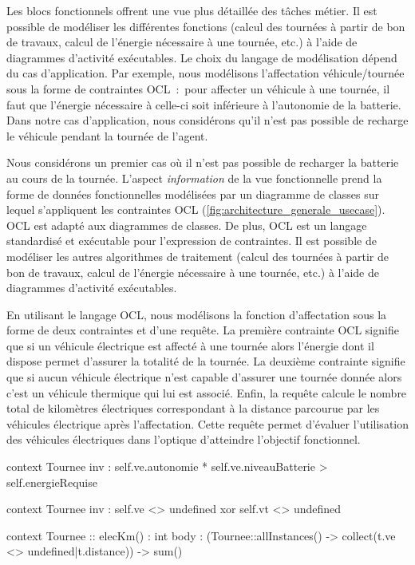 Les blocs fonctionnels offrent une vue plus détaillée des tâches métier. Il est possible de modéliser les différentes fonctions (calcul des tournées à partir de bon de travaux, calcul de l'énergie nécessaire à une tournée, etc.) à l'aide de diagrammes d'activité exécutables. Le choix du langage de modélisation dépend du cas d'application. Par exemple, nous modélisons l'affectation véhicule/tournée sous la forme de contraintes OCL~:~pour affecter un véhicule à une tournée, il faut que l'énergie nécessaire à celle-ci soit inférieure à l'autonomie de la batterie. Dans notre cas d'application, nous considérons qu'il n'est pas possible de recharge le véhicule pendant la tournée de l'agent.

Nous considérons un premier cas où il n'est pas possible de recharger la batterie au cours de la tournée. L'aspect \emph{information} de la vue fonctionnelle prend la forme de données fonctionnelles  modélisées par un diagramme de classes sur lequel s'appliquent les contraintes OCL (\ref{fig:architecture_generale_usecase}). OCL est adapté aux diagrammes de classes. De plus, OCL est un langage standardisé et exécutable pour l'expression de contraintes. Il est possible de modéliser les autres algorithmes de traitement (calcul des tournées à partir de bon de travaux, calcul de l'énergie nécessaire à une tournée, etc.) à l'aide de diagrammes d'activité exécutables.

En utilisant le langage OCL, nous modélisons la fonction d'affectation sous la forme de deux contraintes et d'une requête. La première contrainte OCL signifie que si un véhicule électrique est affecté à une tournée alors l'énergie dont il dispose permet d'assurer la totalité de la tournée.
La deuxième contrainte signifie que si aucun véhicule électrique n'est capable d'assurer une tournée donnée alors c'est un véhicule thermique qui lui est associé. Enfin, la requête calcule le nombre total de kilomètres électriques correspondant à la distance parcourue par les véhicules électrique après l'affectation. Cette requête permet d'évaluer l'utilisation  des véhicules électriques dans l'optique d'atteindre l'objectif fonctionnel.

\begin{queryl}[linewidth=15cm]
context Tournee
inv : 
self.ve.autonomie * self.ve.niveauBatterie > self.energieRequise

context Tournee
inv : self.ve <> undefined xor self.vt <> undefined

context Tournee :: elecKm() : int
body :  
(Tournee::allInstances() -> collect(t.ve <> undefined|t.distance)) 
-> sum()
\end{queryl}


